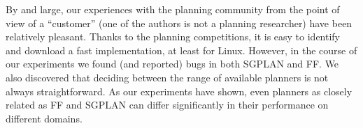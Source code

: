 By and large, our experiences with the planning community from the point of
view of a ``customer'' (one of the authors is not a planning researcher)
have been relatively pleasant. Thanks to the planning competitions, it is
easy to identify and download a fast implementation, at least for Linux.
However, in the course of our experiments we found (and reported) bugs in
both SGPLAN and FF. We also discovered that deciding between the range of
available planners is not always straightforward. As our experiments have
shown, even planners as closely related as FF and SGPLAN can differ
significantly in their performance on different domains.



